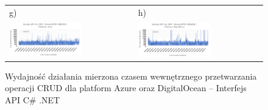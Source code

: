 \begin{figure}[H]
\begin{tabular}{@{}ll@{}}
    g) & h) \\
    \includegraphics[width=0.6\textwidth]{rys05/dotnet-delete-azure.pdf} & \includegraphics[width=0.6\textwidth]{rys05/dotnet-delete-digitalocean.pdf} \\
	\end{tabular}
  \caption{Wydajność działania mierzona czasem wewnętrznego przetwarzania operacji CRUD dla platform Azure oraz DigitalOcean -- Interfejs API C\# .NET}
  \label{fig:dotnet-azure-vs-digitalocean}
\end{figure}

